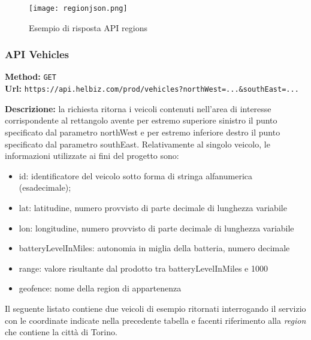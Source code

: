 \begin{figure}[H]
\centering
\texttt{[image: regionjson.png]}
\caption*{Esempio di risposta API regions}
\label{fig:footprint}
\end{figure}



\subsubsection{API Vehicles}

\textbf{Method:} \texttt{GET} \\
\textbf{Url:} \texttt{https://api.helbiz.com/prod/vehicles?northWest=...\&southEast=...} \\

\begin{table}[h]
\centering
{}
\end{table}

\noindent\textbf{Descrizione:} la richiesta ritorna i veicoli contenuti nell'area di interesse 
corrispondente al rettangolo avente per estremo superiore sinistro il punto specificato dal
parametro northWest e per estremo inferiore destro il punto specificato dal parametro southEast.
Relativamente al singolo veicolo, le informazioni utilizzate ai fini del progetto sono:
\begin{itemize}
\item id: identificatore del veicolo sotto forma di stringa alfanumerica (esadecimale);
\item lat: latitudine, numero provvisto di parte decimale di lunghezza variabile 
\item lon: longitudine, numero provvisto di parte decimale di lunghezza variabile
\item batteryLevelInMiles: autonomia in miglia della batteria, numero decimale 
\item range: valore risultante dal prodotto tra batteryLevelInMiles e 1000
\item geofence: nome della region di appartenenza
\end{itemize}
Il seguente listato contiene due veicoli di esempio ritornati interrogando il servizio
con le coordinate indicate nella precedente tabella e facenti riferimento alla \emph{region}
che contiene la città di Torino.

